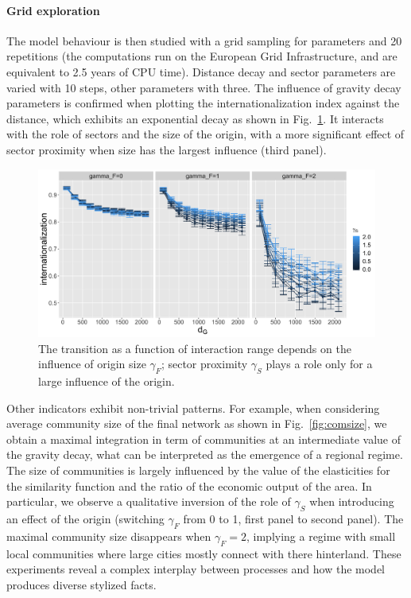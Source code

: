 \documentclass[11pt]{article}
\begin{document}
\paragraph{Grid exploration}

The model behaviour is then studied with a grid sampling for parameters and 20 repetitions (the computations run on the European Grid Infrastructure, and are equivalent to 2.5 years of CPU time). Distance decay and sector  parameters are varied with 10 steps, other parameters with three. The influence of gravity decay parameters is confirmed when plotting the internationalization index against the distance, which exhibits an exponential decay as shown in Fig.~\ref{fig:internat}. It interacts with the role of sectors and the size of the origin, with a more significant effect of sector proximity when size has the largest influence (third panel).


\begin{figure}
    \includegraphics[width=\textwidth]{figures/internationalization_countryGravityDecay200_gammaDestination0_facetwrapgammaOrigin_colorgammaSectors.png}
    \caption{The transition as a function of interaction range depends on the influence of origin size $\gamma_F$; sector proximity $\gamma_S$ plays a role only for a large influence of the origin.\label{fig:internat}}
\end{figure}


Other indicators exhibit non-trivial patterns. For example, when considering average community size of the final network as shown in Fig.~\ref{fig:comsize}, we obtain a maximal integration in term of communities at an intermediate value of the gravity decay, what can be interpreted as the emergence of a regional regime. The size of communities is largely influenced by the value of the elasticities for the similarity function and the ratio of the economic output of the area. In particular, we observe a qualitative inversion of the role of $\gamma_S$ when introducing an effect of the origin (switching $\gamma_F$ from 0 to 1, first panel to second panel). The maximal community size disappears when $\gamma_F = 2$, implying a regime with small local communities where large cities mostly connect with there hinterland. These experiments reveal a complex interplay between processes and how the model produces diverse stylized facts.
\end{document}
